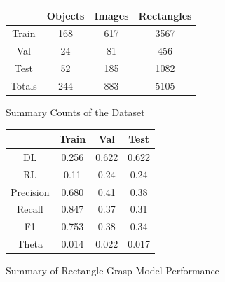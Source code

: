 \documentclass{article}
\begin{document}
\begin{figure}
\centering
\begin{tabular}{c|c|c|c|}
&Objects&Images&Rectangles\\
\hline
Train&168&617&3567\\
\hline
Val&24&81&456\\
\hline
Test&52&185&1082\\
\hline
Totals&244&883&5105\\
\hline
\end{tabular}
\caption{Summary Counts of the Dataset}
\label{fig:summary}
\end{figure}

\begin{figure}
\centering
\begin{tabular}{|c | c | c | c|}
\hline
&Train&Val&Test\\
\hline
DL&0.256&0.622&0.622\\
\hline
RL&0.11&0.24&0.24\\
\hline
Precision&0.680&0.41&0.38\\
\hline
Recall&0.847&0.37&0.31\\
\hline
F1&0.753&0.38&0.34\\
\hline
Theta&0.014&0.022&0.017\\
\hline
\end{tabular}
\caption{Summary of Rectangle Grasp Model Performance}
\label{fig:test_results}
\end{figure}




\end{document}

